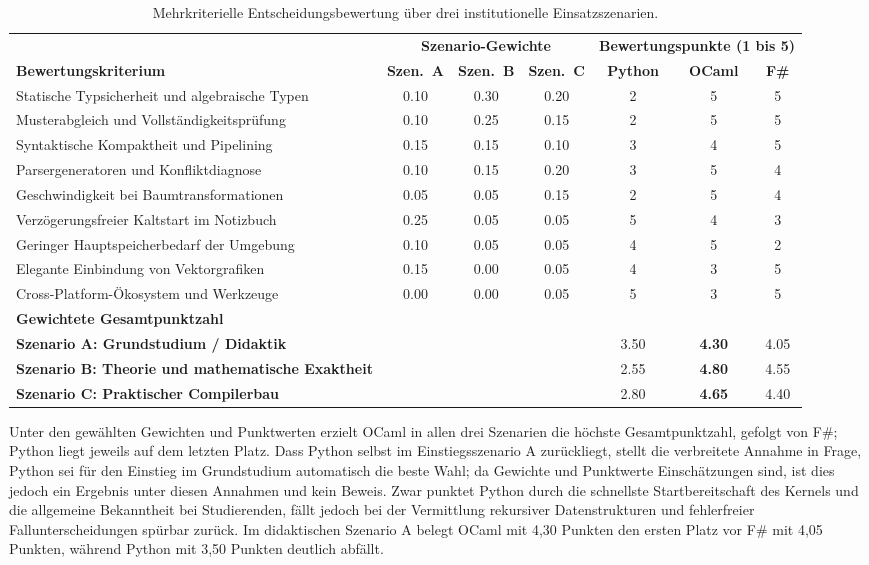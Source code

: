 \begin{table}[htbp]
  \centering
  \small
  \caption{Mehrkriterielle Entscheidungsbewertung über drei institutionelle Einsatzszenarien.}
  \label{tab:mcda_scoring}
  \begin{tabularx}{\textwidth}{>{\raggedright\arraybackslash}Xcccccc}
    \toprule
    & \multicolumn{3}{c}{\textbf{Szenario-Gewichte}} & \multicolumn{3}{c}{\textbf{Bewertungspunkte (1 bis 5)}} \\
    \cmidrule(lr){2-4} \cmidrule(lr){5-7}
    \textbf{Bewertungskriterium} & \textbf{Szen.\ A} & \textbf{Szen.\ B} & \textbf{Szen.\ C} & \textbf{Python} & \textbf{OCaml} & \textbf{F\#} \\
    \midrule
    Statische Typsicherheit und algebraische Typen & 0.10 & 0.30 & 0.20 & 2 & 5 & 5 \\
    Musterabgleich und Vollständigkeitsprüfung & 0.10 & 0.25 & 0.15 & 2 & 5 & 5 \\
    Syntaktische Kompaktheit und Pipelining & 0.15 & 0.15 & 0.10 & 3 & 4 & 5 \\
    Parsergeneratoren und Konfliktdiagnose & 0.10 & 0.15 & 0.20 & 3 & 5 & 4 \\
    Geschwindigkeit bei Baumtransformationen & 0.05 & 0.05 & 0.15 & 2 & 5 & 4 \\
    Verzögerungsfreier Kaltstart im Notizbuch & 0.25 & 0.05 & 0.05 & 5 & 4 & 3 \\
    Geringer Hauptspeicherbedarf der Umgebung & 0.10 & 0.05 & 0.05 & 4 & 5 & 2 \\
    Elegante Einbindung von Vektorgrafiken & 0.15 & 0.00 & 0.05 & 4 & 3 & 5 \\
    Cross-Platform-Ökosystem und Werkzeuge & 0.00 & 0.00 & 0.05 & 5 & 3 & 5 \\
    \midrule
    \textbf{Gewichtete Gesamtpunktzahl} & & & & & & \\
    \textbf{Szenario A: Grundstudium / Didaktik} & & & & 3.50 & \textbf{4.30} & 4.05 \\
    \textbf{Szenario B: Theorie und mathematische Exaktheit} & & & & 2.55 & \textbf{4.80} & 4.55 \\
    \textbf{Szenario C: Praktischer Compilerbau} & & & & 2.80 & \textbf{4.65} & 4.40 \\
    \bottomrule
  \end{tabularx}
\end{table}

Unter den gewählten Gewichten und Punktwerten erzielt OCaml in allen drei Szenarien die höchste Gesamtpunktzahl, gefolgt von F\#; Python liegt jeweils auf dem letzten Platz.
Dass Python selbst im Einstiegsszenario A zurückliegt, stellt die verbreitete Annahme in Frage, Python sei für den Einstieg im Grundstudium automatisch die beste Wahl; da Gewichte und Punktwerte Einschätzungen sind, ist dies jedoch ein Ergebnis unter diesen Annahmen und kein Beweis.
Zwar punktet Python durch die schnellste Startbereitschaft des Kernels und die allgemeine Bekanntheit bei Studierenden, fällt jedoch bei der Vermittlung rekursiver Datenstrukturen und fehlerfreier Fallunterscheidungen spürbar zurück.
Im didaktischen Szenario A belegt OCaml mit 4,30 Punkten den ersten Platz vor F\# mit 4,05 Punkten, während Python mit 3,50 Punkten deutlich abfällt.

